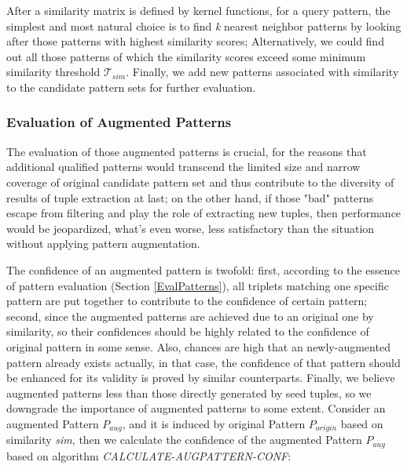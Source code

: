 After a similarity matrix is defined by kernel functions, for a query pattern, the simplest and most natural choice is to find \emph{k} nearest neighbor patterns by looking after those patterns with highest similarity scores; Alternatively, we could find out all those patterns of which the similarity scores exceed some minimum similarity threshold $\mathcal {T}_{sim}$. Finally, we add new patterns associated with similarity to the candidate pattern sets for further evaluation.

\subsubsection{Evaluation of Augmented Patterns}
The evaluation of those augmented patterns is crucial, for the reasons that additional qualified patterns would transcend the limited size and narrow coverage of original candidate pattern set and thus contribute to the diversity of results of tuple extraction at last; on the other hand, if those "bad" patterns escape from filtering and play the role of extracting new tuples, then performance would be jeopardized, what's even worse, less satisfactory than the situation without applying pattern augmentation.

The confidence of an augmented pattern is twofold: first, according to the essence of pattern evaluation (Section \ref{EvalPatterns}), all triplets matching one specific pattern are put together to contribute to the confidence of certain pattern; second, since the augmented patterns are achieved due to an original one by similarity, so their confidences should be highly related to the confidence of original pattern in some sense. Also, chances are high that an newly-augmented pattern already exists actually, in that case, the confidence of that pattern should be enhanced for its validity is proved by similar counterparts. Finally, we believe augmented patterns less than those directly generated by seed tuples, so we downgrade the importance of augmented patterns to some extent. Consider an augmented Pattern \emph{$P_{aug}$}, and it is induced by original Pattern \emph{$P_{origin}$} based on similarity \emph{sim}, then we calculate the confidence of the augmented Pattern \emph{$P_{aug}$} based on algorithm \emph{CALCULATE-AUGPATTERN-CONF}:



